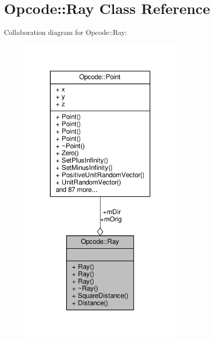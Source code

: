 \hypertarget{classOpcode_1_1Ray}{}\section{Opcode\+:\+:Ray Class Reference}
\label{classOpcode_1_1Ray}


Collaboration diagram for Opcode\+:\+:Ray\+:
\nopagebreak
\begin{figure}[H]
\begin{center}
\leavevmode
\includegraphics[width=230pt]{d2/d08/classOpcode_1_1Ray__coll__graph}
\end{center}
\end{figure}

